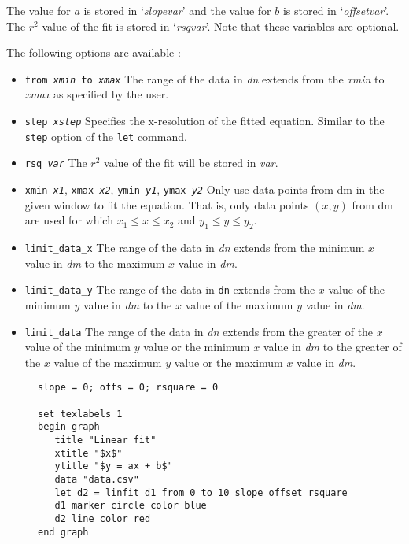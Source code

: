 \begin{commanddescription}
The value for $a$ is stored in `{\it slopevar}' and the value for $b$ is stored in `{\it offsetvar}'. The $r^2$ value of the fit is stored in `{\it rsqvar}'. Note that these variables are optional.

The following options are available :
\begin{itemize}
\item \texttt{from {\it xmin} to {\it xmax}} The range of the data in \textit{dn} extends from the \textit{xmin} to \textit{xmax} as specified by the user.

\item \texttt{step {\it xstep}} Specifies the x-resolution of the fitted equation. Similar to the \texttt{step} option of the \texttt{let} command.

\item \texttt{rsq {\it var}} The $r^2$ value of the fit will be stored in {\it var}.

\item \texttt{xmin {\it x1}}, \texttt{xmax {\it x2}}, \texttt{ymin {\it y1}}, \texttt{ymax {\it y2}} Only use data points from dm in the given window to fit the equation. That is, only data points $(x,y)$ from dm are used for which $x_1 \le x \le x_2$ and $y_1 \le y \le y_2$.

\item \texttt{limit\_data\_x} The range of the data in \textit{dn} extends from the minimum $x$ value in \textit{dm} to the maximum $x$ value in \textit{dm}.

\item \texttt{limit\_data\_y} The range of the data in \texttt{dn} extends from the $x$ value of the minimum $y$ value in \textit{dm} to the $x$ value of the maximum $y$ value in \textit{dm}.

\item \texttt{limit\_data} The range of the data in \textit{dn} extends from the greater of the $x$ value of the minimum $y$ value or the minimum $x$ value in \textit{dm} to the greater of the $x$ value of the maximum $y$ value or the maximum $x$ value in \textit{dm}.
\end{itemize}

\begin{figure}[tb]
\begin{minipage}[c]{9.2cm}
\begin{Verbatim}
slope = 0; offs = 0; rsquare = 0

set texlabels 1
begin graph
   title "Linear fit"
   xtitle "$x$"
   ytitle "$y = ax + b$"
   data "data.csv"
   let d2 = linfit d1 from 0 to 10 slope offset rsquare
   d1 marker circle color blue
   d2 line color red
end graph


\end{Verbatim}
\end{minipage}
\end{figure}
\end{commanddescription}
